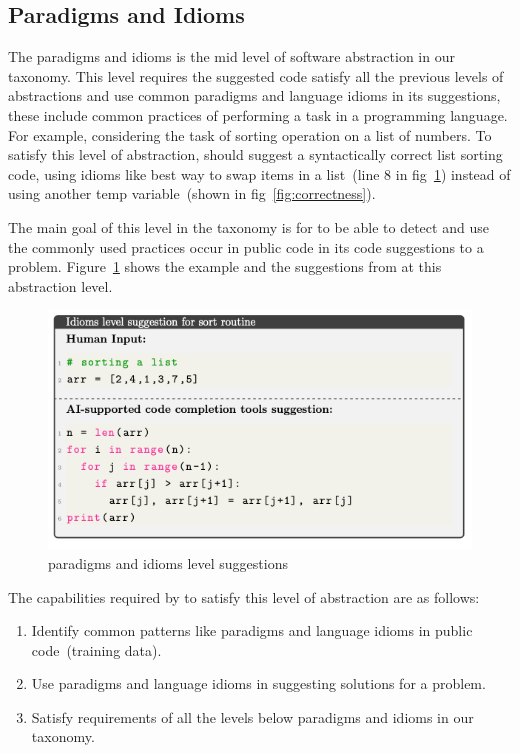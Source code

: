 \subsection{Paradigms and Idioms}
The paradigms and idioms is the mid level of software abstraction in our taxonomy. This level requires the suggested code satisfy all the previous levels of abstractions and use common paradigms and language idioms in its suggestions, these include common practices of performing a task in a programming language. 
For example, considering the task of sorting operation on a list of numbers. To satisfy this level of abstraction, \cct{} should suggest a syntactically correct list sorting code, using idioms like best way to swap items in a list~(line 8 in fig~\ref{fig:idioms}) instead of using another temp variable~(shown in fig~\ref{fig:correctness}). 

The main goal of this level in the taxonomy is for \cct{} to be able to detect and use the commonly used practices occur in public code in its code suggestions to a problem.
Figure~\ref{fig:idioms} shows the example and the suggestions from \cct{} at this abstraction level.

\begin{figure}[hbt!]
    \centering
    \includegraphics[width=\linewidth]{Figures/idioms.png}
    \caption{\cct{} paradigms and idioms level suggestions}
    \label{fig:idioms}
\end{figure}

The capabilities required by \cct{} to satisfy this level of abstraction are as follows:
\begin{enumerate}
    \item Identify common patterns like paradigms and language idioms in public code~(training data).
    \item Use paradigms and language idioms in suggesting solutions for a problem.
    \item Satisfy requirements of all the levels below paradigms and idioms in our taxonomy.
\end{enumerate}

